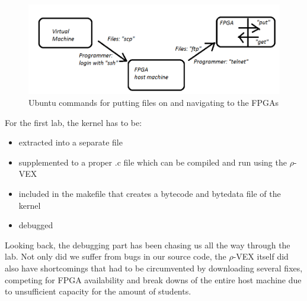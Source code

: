 \begin{figure}[htb]%
\includegraphics[width=\columnwidth]{Pictures/hop}%
\caption{Ubuntu commands for putting files on and navigating to the FPGAs}%
\label{fig:hoppen}%
\end{figure}

For the first lab, the  kernel has to be:
\begin{itemize}
	\item extracted into a separate file
	\item supplemented to a proper .c file which can be compiled and run using the $\rho$-VEX
	\item included in the makefile that creates a bytecode and bytedata file of the kernel
	\item debugged
\end{itemize}

Looking back, the debugging part has been chasing us all the way through the lab. Not only did we suffer from bugs in our source code, the $\rho$-VEX itself did also have shortcomings that had to be circumvented by downloading several fixes, competing for FPGA availability and break downs of the entire host machine due to unsufficient capacity for the amount of students.

